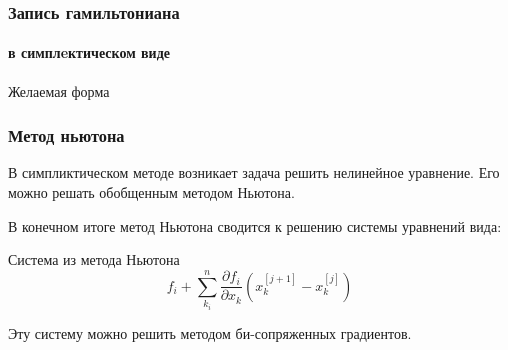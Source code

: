 \documentclass[t]{beamer}
\begin{document}
\begin{frame}
    \frametitle{Запись гамильтониана}
    \framesubtitle{в симплeктическом виде}
    \begin{block}{Желаемая форма}
        
    \end{block}
\end{frame}

\begin{frame}
    \frametitle{Метод ньютона}

    В симпликтическом методе возникает задача решить нелинейное
    уравнение. Его можно решать обобщенным методом Ньютона.

    В конечном итоге метод Ньютона сводится к решению системы уравнений
    вида:

    \begin{block}{Система из метода Ньютона}
        \begin{equation*}
            f_i + \sum_{k_i}^n \frac{\partial f_i}{\partial x_k}
            \left(x_k^{[j+1]} - x_k^{[j]}\right)
        \end{equation*}
    \end{block}

    \pause

    Эту систему можно решить методом би-сопряженных градиентов.
\end{frame}
\end{document}
